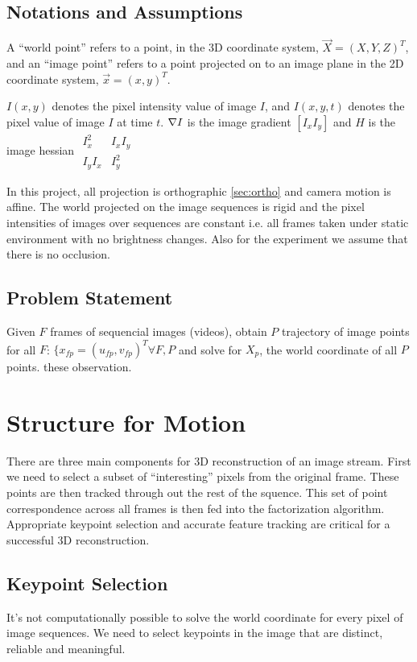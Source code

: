 \subsection{Notations and Assumptions}
\label{sec:notations}
A ``world point'' refers to a point, in the 3D
coordinate system, $\vec X = (X,Y,Z)^T$, and an ``image point'' refers
to a point projected on to an image plane in the 2D coordinate system,
$\vec x =(x,y)^T$. 

$I(x,y)$ denotes the pixel intensity value of image $I$, and $I(x,y,t)$ denotes the
pixel value of image $I$ at time $t$. $\nabla I$ is the image gradient
$[I_x  I_y]$ and $H$ is the image hessian $\begin{smallmatrix}  I_x^2
  & I_xI_y \\ I_yI_x & I_y^2\end{smallmatrix}$

In this project, all projection is orthographic \ref{sec:ortho}
and camera motion is affine. The world projected on the image
sequences is rigid and the pixel intensities of images over sequences are
constant i.e. all frames taken under static environment with no
brightness changes. Also for the experiment we assume that there is
no occlusion.

\subsection{Problem Statement}
\label{sec:problem-statement}
Given $F$ frames of sequencial images (videos), obtain $P$ trajectory
of image points for all $F$: $\{x_{fp} = (u_{fp}, v_{fp})^T
\forall F, P$ and solve for $X_{p}$, the world coordinate of all $P$ points.
these observation. 

\section{Structure for Motion}
\label{sec:main}
There are three main components for 3D reconstruction of an image stream. First we need to select a subset of
``interesting'' pixels from the original frame. These points are then
tracked through out the rest of the squence. This set of point
correspondence across all frames is then fed into the factorization algorithm. Appropriate keypoint selection and accurate feature tracking
are critical for a successful 3D reconstruction. 

\subsection{Keypoint Selection}
\label{sec:keypoint-selection}
It's not computationally possible to solve the world coordinate for every pixel of image sequences. We need to
select keypoints in the image that are distinct, reliable and
meaningful. 

